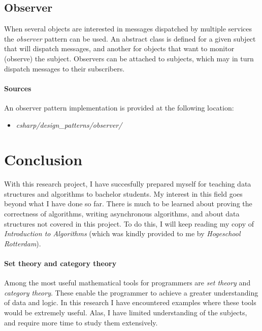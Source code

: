 \documentclass{article}
\begin{document}
\subsection{Observer}
When several objects are interested in messages dispatched by multiple services the {\em observer} pattern can be used.
An abstract class is defined for a given subject that will dispatch messages, and another for objects that want to monitor
(observe) the subject. Observers can be attached to subjects, which may in turn dispatch messages to their subscribers.

\begin{samepage}
  \paragraph{Sources}
  An observer pattern implementation is provided at the following location:
  \begin{itemize}
  \item{{\em csharp/design\_patterns/observer/}}
  \end{itemize}
\end{samepage}


\newpage


\section{Conclusion}
With this research project, I have succesfully prepared myself for teaching data structures and algorithms to bachelor students.
My interest in this field goes beyond what I have done so far. There is much to be learned about proving the correctness of
algorithms, writing asynchronous algorithms, and about data structures not covered in this project. To do this, I will keep
reading my copy of {\em Introduction to Algorithms} (which was kindly provided to me by {\em Hogeschool Rotterdam}).

\paragraph{Set theory and category theory}
Among the most useful mathematical tools for programmers are {\em set theory} and {\em category theory}. These enable the
programmer to achieve a greater understanding of data and logic. In this research I have encountered examples where these
tools would be extremely useful. Alas, I have limited understanding of the subjects, and require more time to study them
extensively.
\end{document}
